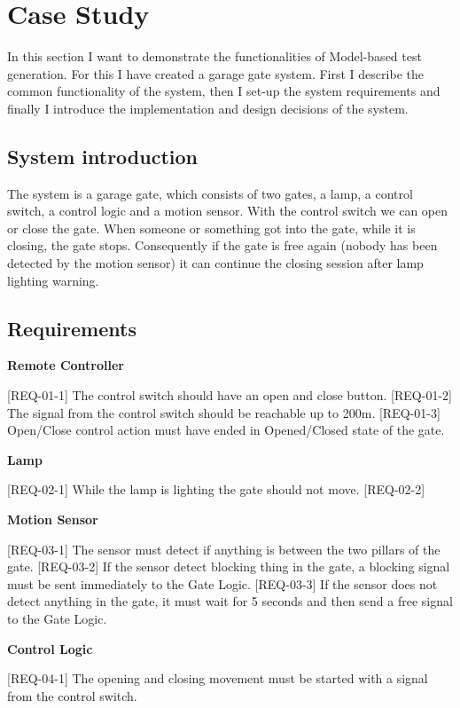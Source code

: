 \chapter{Case Study}\label{sect:case-study}
In this section I want to demonstrate the functionalities of Model-based test generation. For this I have created a garage gate system. First I describe the common functionality of the system, then I set-up the system requirements and finally I introduce the implementation and design decisions of the system.

\section{System introduction}
The system is a garage gate, which consists of two gates, a lamp, a control switch, a control logic and a motion sensor. With the control switch we can open or close the gate. When someone or something got into the gate, while it is closing, the gate stops. Consequently if the gate is free again (nobody has been detected by the motion sensor) it can continue the closing session after lamp lighting warning.

\section{Requirements}
\textbf{Remote Controller}

[REQ-01-1] The control switch should have an open and close button.
[REQ-01-2] The signal from the control switch should be reachable up to 200m.
[REQ-01-3] Open/Close control action must have ended in Opened/Closed state of the gate.

\textbf{Lamp}

[REQ-02-1] While the lamp is lighting the gate should not move.
[REQ-02-2] 

\textbf{Motion Sensor}

[REQ-03-1] The sensor must detect if anything is between the two pillars of the gate.
[REQ-03-2] If the sensor detect blocking thing in the gate, a blocking signal must be sent immediately to the Gate Logic.
[REQ-03-3] If the sensor does not detect anything in the gate, it must wait for 5 seconds and then send a free signal to the Gate Logic.

\textbf{Control Logic}

[REQ-04-1] The opening and closing movement must be started with a signal from the control switch.

